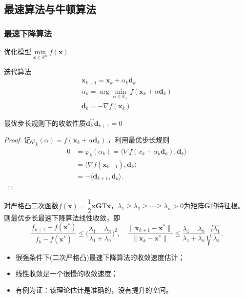 \subsection{最速算法与牛顿算法}

\subsubsection{最速下降算法}
优化模型$\min\limits_{\boldsymbol{x}\in\mathbb{R}^n}f(\boldsymbol{x})$

迭代算法
\[
    \begin{array}{c}
        \boldsymbol{x}_{k+1} = \boldsymbol{x}_{k} + \alpha_{k}\boldsymbol{d}_{k} \\
        \alpha_{k} = \arg\min\limits_{\alpha\in \mathbb{R}_{+}}f(\boldsymbol{x}_k+\alpha\boldsymbol{d}_k)\\
        \boldsymbol{d}_{k} = -\nabla f(\boldsymbol{x}_k)
    \end{array}  
\]
\begin{corollary}[最优步长规则下的收敛性质]
    最优步长规则下的收敛性质$\boldsymbol{d}_{k}^{\mathrm{T}}\boldsymbol{d}_{k+1} = 0$
\end{corollary}
\begin{proof}
    记$\varphi_k(\alpha)=f(\boldsymbol{x}_k+\alpha\boldsymbol{d}_k).$，利用最优步长规则
    \[
        \begin{aligned}
            0 & =\varphi_{k}^{\prime}(\alpha_{k})=\langle\nabla f(x_{k}+\alpha_{k}\boldsymbol{d}_{k}),\boldsymbol{d}_{k}\rangle   \\
            &=\langle\nabla f(\boldsymbol{x}_{k+1}),\boldsymbol{d}_k\rangle  \\
            &=-\langle\boldsymbol{d}_{k+1},\boldsymbol{d}_{k}\rangle.
        \end{aligned}
    \]
\end{proof}
\begin{theorem}[收敛速度估计]
    对严格凸二次函数$f(\boldsymbol{x}) = \dfrac{1}{2}\boldsymbol{xG}{\mathrm{T}}\boldsymbol{x}$，$\lambda_1\geqslant\lambda_2\geqslant\cdots\geqslant \lambda_n>0$为矩阵$\boldsymbol{G}$的特征根。则最优步长最速下降算法线性收敛，即
    \[
        \frac{f_{k+1}-f(\boldsymbol{x}^*)}{f_k-f(\boldsymbol{x}^*)}\leqslant\Big(\frac{\lambda_1-\lambda_n}{\lambda_1+\lambda_n}\Big)^2,\quad \frac{\lVert\boldsymbol{x}_{k+1}-\boldsymbol{x}^*\rVert}{\lVert\boldsymbol{x}_k-\boldsymbol{x}^*\rVert}\leqslant\frac{\lambda_1-\lambda_n}{\lambda_1+\lambda_n}\sqrt{\frac{\lambda_1}{\lambda_n}}.
    \]
    \begin{itemize}
        \item  很强条件下(二次严格凸)最速下降算法的收敛速度估计；
        \item  线性收敛是一个很慢的收敛速度；
        \item 有例为证：该理论估计是准确的，没有提升的空间。
    \end{itemize}
\end{theorem}
